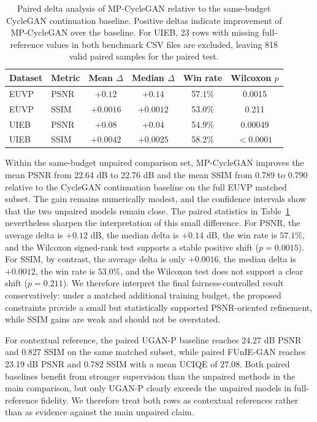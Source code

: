 \documentclass[final,1p,times]{elsarticle}
\begin{document}
\begin{table}[!t]
\centering
\caption{Paired delta analysis of MP-CycleGAN relative to the same-budget CycleGAN continuation baseline. Positive deltas indicate improvement of MP-CycleGAN over the baseline. For UIEB, 23 rows with missing full-reference values in both benchmark CSV files are excluded, leaving 818 valid paired samples for the paired test.}
\label{tab:paired_delta}
\begin{tabular}{llcccc}
\toprule
Dataset & Metric & Mean $\Delta$ & Median $\Delta$ & Win rate & Wilcoxon $p$ \\
\midrule
EUVP & PSNR & $+0.12$ & $+0.14$ & 57.1\% & 0.0015 \\
EUVP & SSIM & $+0.0016$ & $+0.0012$ & 53.0\% & 0.211 \\
UIEB & PSNR & $+0.08$ & $+0.04$ & 54.9\% & 0.00049 \\
UIEB & SSIM & $+0.0042$ & $+0.0025$ & 58.2\% & $<0.0001$ \\
\bottomrule
\end{tabular}
\end{table}

Within the same-budget unpaired comparison set, MP-CycleGAN improves the mean PSNR from 22.64 dB to 22.76 dB and the mean SSIM from 0.789 to 0.790 relative to the CycleGAN continuation baseline on the full EUVP matched subset. The gain remains numerically modest, and the confidence intervals show that the two unpaired models remain close. The paired statistics in Table~\ref{tab:paired_delta} nevertheless sharpen the interpretation of this small difference. For PSNR, the average delta is $+0.12$ dB, the median delta is $+0.14$ dB, the win rate is $57.1\%$, and the Wilcoxon signed-rank test supports a stable positive shift ($p=0.0015$). For SSIM, by contrast, the average delta is only $+0.0016$, the median delta is $+0.0012$, the win rate is $53.0\%$, and the Wilcoxon test does not support a clear shift ($p=0.211$). We therefore interpret the final fairness-controlled result conservatively: under a matched additional training budget, the proposed constraints provide a small but statistically supported PSNR-oriented refinement, while SSIM gains are weak and should not be overstated.

For contextual reference, the paired UGAN-P baseline reaches 24.27 dB PSNR and 0.827 SSIM on the same matched subset, while paired FUnIE-GAN reaches 23.19 dB PSNR and 0.782 SSIM with a mean UCIQE of 27.08. Both paired baselines benefit from stronger supervision than the unpaired methods in the main comparison, but only UGAN-P clearly exceeds the unpaired models in full-reference fidelity. We therefore treat both rows as contextual references rather than as evidence against the main unpaired claim.
\end{document}
